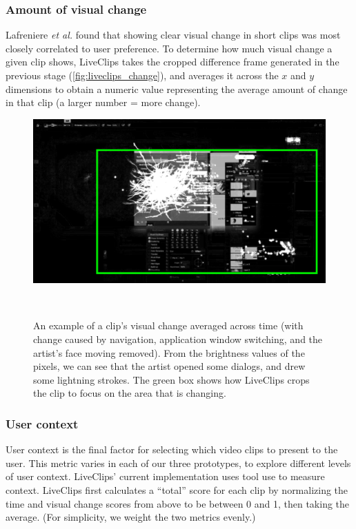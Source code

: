 \subsubsection{Amount of visual change}
 Lafreniere \textit{et al.} \cite{Lafreniere2014} found that showing clear visual change in short clips was most closely correlated to user preference. To determine how much visual change a given clip shows, LiveClips takes the cropped difference frame generated in the previous stage (\autoref{fig:liveclips_change}), and averages it across the $x$ and $y$ dimensions to obtain a numeric value representing the average amount of change in that clip (a larger number = more change).
 
\begin{figure}[b!]
\centering
  \includegraphics[width=0.7\columnwidth]{liveclips/figures/change.png}
  \caption[An example of a clip's visual change averaged across time (with change caused by navigation, application window switching, and the artist's face moving removed).]{An example of a clip's visual change averaged across time (with change caused by navigation, application window switching, and the artist's face moving removed). From the brightness values of the pixels, we can see that the artist opened some dialogs, and drew some lightning strokes. The green box shows how LiveClips crops the clip to focus on the area that is changing. }~\label{fig:liveclips_change}
\end{figure}

\subsubsection{User context}
User context is the final factor for selecting which video clips to present to the user. This metric varies in each of our three prototypes, to explore different levels of user context. LiveClips' current implementation uses tool use to measure context. LiveClips first calculates a ``total'' score for each clip by normalizing the time and visual change scores from above to be between 0 and 1, then taking the average. (For simplicity, we weight the two metrics evenly.) 

